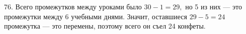 76. Всего промежутков между уроками было $30-1=29,$ но 5 из них --- это промежутки между 6 учебными днями. Значит, оставшиеся $29-5=24$ промежутка --- это перемены, поэтому всего он съел 24 конфеты.\\
